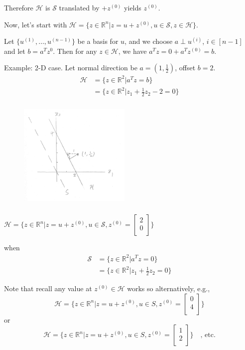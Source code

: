 Therefore $\mathcal{H}$ is $\mathcal{S}$ translated by $+z^{(0)}$ yields $z^{(0)}$. 

Now, let's start with $\mathcal{H} = \{ z \in \mathbb{R}^n | z = u + z^{(0)}, u \in \mathcal{S}, z \in \mathcal{H} \}$. 

Let $\{ u^{(1)}, \dots, u^{(n-1)} \}$ be a basis for $u$, and we choose $a \perp u^{(i)}$, $i \in [n-1]$ and let $b = a^{T} z^{0}$. Then for any $z \in \mathcal{H}$, we have $a^{T} z = 0 + a^{T} z^{(0)} = b$. 


\vspace{0.3cm}
Example: 2-D case.
Let normal direction be $a = (1, \frac{1}{2})$, offset $b = 2$.
\begin{align*}
\mathcal{H} &= \{z \in \mathbb{R}^2 | a^{T} z = b \} \\
&= \{z \in \mathbb{R}^2 | z_1 + \frac{1}{2} z_2 - 2 = 0 \}
\end{align*}


\begin{figure}
	\centering
	\includegraphics[width=2.1in,height=2.1in]{figures/ch02/p37.jpg}
\end{figure}


$\mathcal{H} = \{ z \in \mathbb{R}^n \vert z = u + z^{(0)}, u \in \mathcal{S}, z^{(0)} = \begin{bmatrix} 2\\ 0\\ \end{bmatrix} \}$

when 
\begin{align*}
\mathcal{S} &= \{z \in \mathbb{R}^2 | a^{T} z = 0 \} \\
&= \{z \in \mathbb{R}^2 | z_1 + \frac{1}{2} z_2 = 0 \}
\end{align*}

Note that recall any value at $z^{(0)} \in \mathcal{H}$ works so alternatively, e.g.,
$$\mathcal{H} = \{ z \in \mathbb{R}^n | z = u + z^{(0)}, u \in S, z^{(0)} = \begin{bmatrix} 0\\ 4\\ \end{bmatrix} \}$$
or 
$$\mathcal{H} = \{ z \in \mathbb{R}^n | z = u + z^{(0)}, u \in S, z^{(0)} = \begin{bmatrix} 1\\ 2\\ \end{bmatrix} \}\quad \text{, etc.} $$

